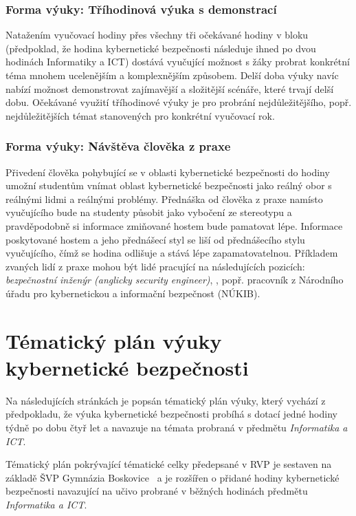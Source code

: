 \documentclass[a4paper, 12pt]{article}
\begin{document}
\subsubsection{Forma výuky: Tříhodinová výuka s demonstrací}
Natažením vyučovací hodiny přes všechny tři očekávané hodiny v bloku (předpoklad, že hodina kybernetické bezpečnosti následuje ihned po dvou hodinách Informatiky a ICT) dostává vyučující možnost s žáky probrat konkrétní téma mnohem ucelenějším a komplexnějším způsobem. Delší doba výuky navíc nabízí možnost demonstrovat zajímavější a složitější scénáře, které trvají delší dobu. Očekávané využití tříhodinové výuky je pro probrání nejdůležitějšího, popř. nejdůležitějších témat stanovených pro konkrétní vyučovací rok. 

\subsubsection{Forma výuky: Návštěva člověka z praxe}
Přivedení člověka pohybující se v oblasti kybernetické bezpečnosti do hodiny umožní studentům vnímat oblast kybernetické bezpečnosti jako reálný obor s reálnými lidmi a reálnými problémy. Přednáška od člověka z praxe namísto vyučujícího bude na studenty působit jako vybočení ze stereotypu a pravděpodobně si informace zmiňované hostem bude pamatovat lépe. Informace poskytované hostem a jeho přednášecí styl se liší od přednášecího stylu vyučujícího, čímž se hodina odlišuje a stává lépe zapamatovatelnou. Příkladem zvaných lidí z praxe mohou být lidé pracující na následujících pozicích: \textit{bezpečnostní inženýr (anglicky security engineer)}, , popř. pracovník z Národního úřadu pro kybernetickou a informační bezpečnost (NÚKIB).




\newpage
\section{Tématický plán výuky kybernetické bezpečnosti}

Na následujících stránkách je popsán tématický plán výuky, který vychází z předpokladu, že výuka kybernetické bezpečnosti probíhá s dotací jedné hodiny týdně po dobu čtyř let a navazuje na témata probraná v předmětu \textit{Informatika a ICT}. 

Tématický plán pokrývající tématické celky předepsané v RVP je sestaven na základě ŠVP Gymnázia Boskovice~\cite{svpGymbos} a je rozšířen o přidané hodiny kybernetické bezpečnosti navazující na učivo probrané v běžných hodinách předmětu \textit{Informatika a ICT}.
\end{document}
